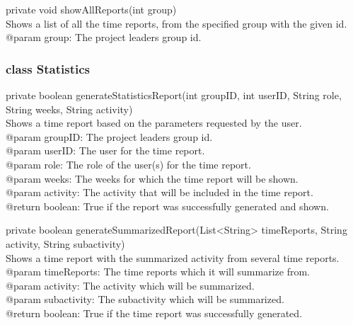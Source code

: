 \documentclass[a4paper]{article}
\begin{document}
\vspace{5mm}
\begin{hangparas}{1.5em}{1}
private void showAllReports(int group)\\
Shows a list of all the time reports, from the specified group with the given id.\\
@param group: The project leaders group id.\\
\end{hangparas}


\subsubsection{class Statistics}

\begin{hangparas}{1.5em}{1}
private boolean generateStatisticsReport(int groupID, int userID, String role, String weeks, String activity)\\
Shows a time report based on the parameters requested by the user.\\
@param groupID: The project leaders group id.\\
@param userID: The user for the time report.\\
@param role: The role of the user(s) for the time report.\\
@param weeks: The weeks for which the time report will be shown.\\
@param activity: The activity that will be included in the time report.\\
@return boolean: True if the report was successfully generated and shown.
\end{hangparas}

\vspace{5mm}
\begin{hangparas}{1.5em}{1}
private boolean generateSummarizedReport(List<String> timeReports, String activity, String subactivity)\\
Shows a time report with the summarized activity from several time reports.\\
@param timeReports: The time reports which it will summarize from.\\
@param activity: The activity which will be summarized.\\
@param subactivity: The subactivity which will be summarized.\\
@return boolean: True if the time report was successfully generated.
\end{hangparas}
\end{document}
